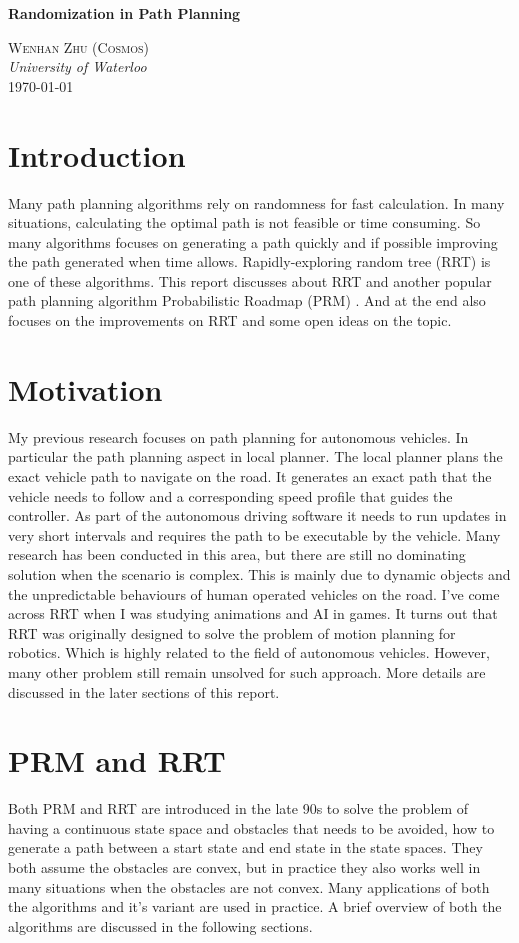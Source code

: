 \documentclass[12pt]{article}
\renewcommand{\maketitle}{
    \begin{flushright}
        {\LARGE \textbf{Randomization in Path Planning}}


    {\large \textsc{Wenhan Zhu (Cosmos)} \\ \textit{University of Waterloo}}
    \\ \today

    \end{flushright}
}
\begin{document}
\maketitle

\section*{Introduction}
Many path planning algorithms rely on randomness for fast calculation. In many situations, calculating the optimal path is not feasible or time consuming. So many algorithms focuses on generating a path quickly and if possible improving the path generated when time allows. Rapidly-exploring random tree (RRT)\cite{LaValle1998} is one of these algorithms. This report discusses about RRT and another popular path planning algorithm Probabilistic Roadmap (PRM) \cite{Kavraki1996}. And at the end also focuses on the improvements on RRT and some open ideas on the topic.

\section*{Motivation}
My previous research focuses on path planning for autonomous vehicles. In particular the path planning aspect in local planner. The local planner plans the exact vehicle path to navigate on the road. It generates an exact path that the vehicle needs to follow and a corresponding speed profile that guides the controller. As part of the autonomous driving software it needs to run updates in very short intervals and requires the path to be executable by the vehicle. Many research has been conducted in this area, but there are still no dominating solution when the scenario is complex. This is mainly due to dynamic objects and the unpredictable behaviours of human operated vehicles on the road. I've come across RRT when I was studying animations and AI in games. It turns out that RRT was originally designed to solve the problem of motion planning for robotics. Which is highly related to the field of autonomous vehicles. However, many other problem still remain unsolved for such approach. More details are discussed in the later sections of this report.

\section*{PRM and RRT}
Both PRM and RRT are introduced in the late 90s to solve the problem of having a continuous state space and obstacles that needs to be avoided, how to generate a path between a start state and end state in the state spaces. They both assume the obstacles are convex, but in practice they also works well in many situations when the obstacles are not convex. Many applications of both the algorithms and it's variant are used in practice. A brief overview of both the algorithms are discussed in the following sections. 
\end{document}
